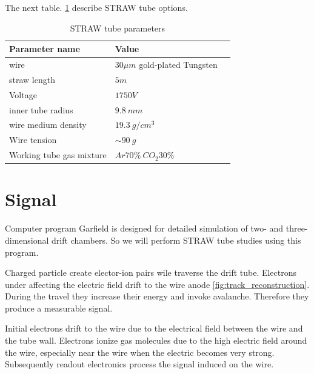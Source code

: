 \documentclass[]{article}
\begin{document}
		The next table. \ref{table:straw_par} describe STRAW tube options.
		

	\begin{table}[h]
	\centering
	\begin{tabular}{|l|l|p{8cm}|}
		\hline
		Parameter name & Value \\
		\hline
		wire & $30\mu m$ gold-plated Tungsten\\
		\hline
		straw length & $5m$ \\
		\hline
		Voltage & $1750 V$ \\
		\hline
		inner tube radius & $9.8~mm$ \\
		\hline
		wire medium density & $19.3 ~g/cm^3$ \\
		\hline
		Wire tension& $\sim 90~g$ \\
		\hline
		Working tube gas mixture & $Ar70\% ~CO_2 30\%$ \\
		\hline
	\end{tabular}
	\caption[Table caption text]{STRAW tube parameters }
	\label{table:straw_par}
	\end{table}		
	
	\section{Signal}	
	Computer program Garfield \cite{garfield} is designed for detailed simulation of two- and three-dimensional drift chambers. So we will perform STRAW tube studies using this program.
	
	Charged particle  create elector-ion pairs wile traverse the drift tube. Electrons under affecting the electric field drift to the wire anode \ref{fig:track_reconstruction}. During the travel they increase their energy and invoke avalanche. Therefore they produce a measurable signal.
	
	  Initial electrons drift to the wire due to the electrical field between the wire and the tube wall. Electrons ionize gas molecules due to the high electric field around the wire, especially near the wire when the electric becomes very strong.  Subsequently readout electronics process the signal induced on the wire.
	  
\end{document}
